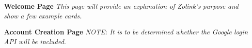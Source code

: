 \documentclass[12pt]{article}%
\begin{document}
\begin{center}
    {\bf \Large Welcome Page}
    {\it This page will provide an explanation of Zolink's purpose and show a few example cards.}

    \clearpage
    {\bf \Large Account Creation Page}
    {\it NOTE: It is to be determined whether the Google login API will be included.}


\end{center}
\end{document}
